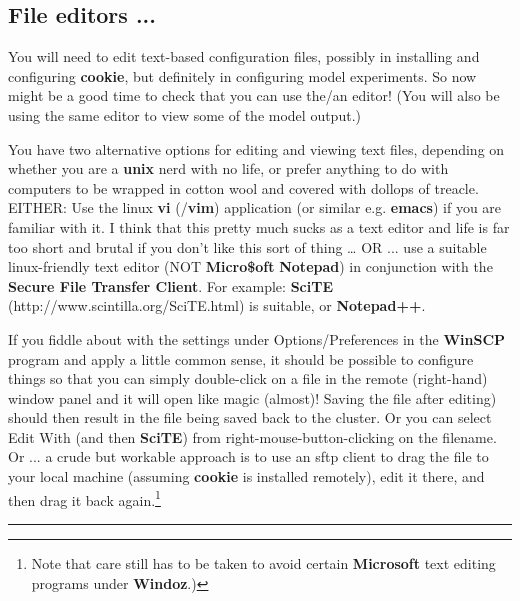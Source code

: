 
\subsection*{File editors ...}

You will need to edit text-based configuration files, possibly in installing and configuring \textbf{cookie}, but definitely in configuring model experiments. So now might be a good time to check that you can use the/an editor! (You will also be using the same editor to view some of the model output.)

You have two alternative options for editing and viewing text files, depending on whether you are a \textbf{unix} nerd with no life, or prefer anything to do with computers to be wrapped in cotton wool and covered with dollops of treacle.
EITHER: Use the linux \textbf{vi} (/\textbf{vim}) application (or similar e.g. \textbf{emacs}) if you are familiar with it. I think that this pretty much sucks as a text editor and life is far too short and brutal if you don't like this sort of thing … OR ... use a suitable linux-friendly text editor (NOT \textbf{Micro\$oft} \textbf{Notepad}) in conjunction with the \textbf{Secure File Transfer Client}. For example: \textbf{SciTE} (http://www.scintilla.org/SciTE.html) is suitable, or \textbf{Notepad++}.

If you fiddle about with the settings under Options/Preferences in the \textbf{WinSCP} program and apply a little common sense, it should be possible to configure things so that you can simply double-click on a file in the remote (right-hand) window panel and it will open like magic (almost)! Saving the file after editing) should then result in the file being saved back to the cluster. Or you can select Edit With (and then \textbf{SciTE}) from right-mouse-button-clicking on the filename. Or ... a crude but workable approach is to use an sftp client to drag the file to your local machine (assuming \textbf{cookie} is installed remotely), edit it there, and then drag it back again.\footnote{Note that care still has to be taken to avoid certain \textbf{Microsoft} text editing programs under \textbf{Windoz}.)}

\vspace{1mm}\noindent\rule{4cm}{0.5pt}\vspace{2mm}

\newpage

